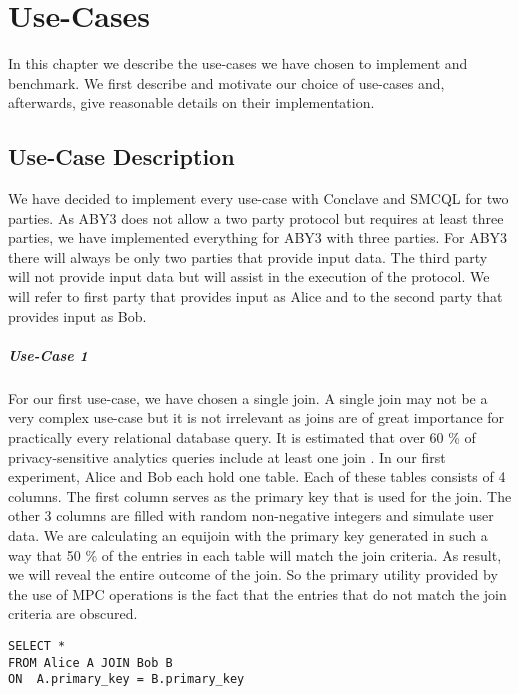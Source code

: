 \chapter{Use-Cases}
In this chapter we describe the use-cases we have chosen to implement and benchmark. We first describe and motivate our choice of use-cases and, afterwards, give reasonable details on their implementation.
\section{Use-Case Description} 
We have decided to implement every use-case with Conclave and SMCQL for two parties. As ABY3 does not allow a two party protocol but requires at least three parties, we have implemented everything for ABY3 with three parties. For ABY3 there will always be only two parties that provide input data. The third party will not provide input data but will assist in the execution of the protocol. We will refer to first party that provides input as Alice and to the second party that provides input as Bob. 
\paragraph{Use-Case 1}
For our first use-case, we have chosen a single join. A single join may not be a very complex use-case but it is not irrelevant as joins are of great importance for practically every relational database query. It is estimated that over 60 \% of privacy-sensitive analytics queries include at least one join \cite{johnson2017practical}. In our first experiment, Alice and Bob each hold one table. Each of these tables consists of 4 columns. The first column serves as the primary key that is used for the join. The other 3 columns are filled with random non-negative integers and simulate user data. We are calculating an equijoin with the primary key generated in such a way that 50 \% of the entries in each table will match the join criteria. As result, we will reveal the entire outcome of the join. So the primary utility provided by the use of MPC operations is the fact that the entries that do not match the join criteria are obscured.

\label{SQL1_label}				
\begin{lstlisting}[caption={ Functional equivalent SQL statement for our first use-case  }]
SELECT * 
FROM Alice A JOIN Bob B 
ON  A.primary_key = B.primary_key
\end{lstlisting}
\label{SQL1}
			
